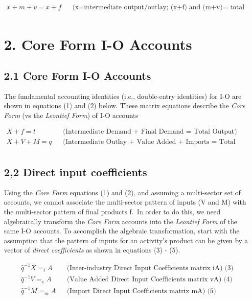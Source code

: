 \documentclass[
  letterpaper,
  DIV=11,
  numbers=noendperiod]{scrreprt}
\begin{document}
\[
\begin{align}
  x+m+v = x+f     && \text{(x=intermediate output/outlay; (x+f) and (m+v)= total output)}\\
\end{align}
\]

\section{2. Core Form I-O Accounts}\label{core-form-i-o-accounts}

\subsection{2.1 Core Form I-O Accounts}\label{core-form-i-o-accounts-1}

The fundamental accounting identities (i.e., double-entry identities)
for I-O are shown in equations (1) and (2) below. These matrix equations
describe the \emph{Core Form} (vs the \emph{Leontief Form}) of I-O
accounts

\[
\begin{align}
    X + f = t && \text{(Intermediate Demand + Final Demand = Total Output) (1)}\\
    X + V + M = q && \text{(Intermediate Outlay + Value Added + Imports = Total Outlay) (2)}\\
\end{align}
\]

\subsection{2,2 Direct input
coefficients}\label{direct-input-coefficients}

Using the \emph{Core Form} equations (1) and (2), and assuming a
multi-sector set of accounts, we cannot associate the multi-sector
pattern of inputs (V and M) with the multi-sector pattern of final
products f.~In order to do this, we need algebraically transform the
\emph{Core Form} accounts into the \emph{Leontief Form} of the same I-O
accounts. To accomplish the algebraic transformation, start with the
assumption that the pattern of inputs for an activity's product can be
given by a vector of \emph{direct coefficients} as shown in equations
(3) - (5).

\[
\begin{align}
    \hat{q}^{-1}X = _{i}A && \text{(Inter-industry Direct Input Coefficients matrix iA) (3)}\\
    \hat{q}^{-1}V = _{v}A && \text{(Value Added Direct Input Coefficients matrix vA) (4)}\\
    \hat{q}^{-1}M = _{m}A && \text{(Import Direct Input Coefficients matrix mA) (5)}\\
\end{align}
\]
\end{document}

